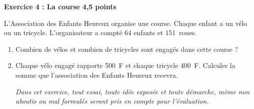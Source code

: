 \textbf{Exercice 4 : La course \hfill 4,5 points}

\medskip

L'Association des Enfants Heureux organise une course. Chaque
enfant a un vélo ou un tricycle. L'organisateur a compté $64$ enfants et
$151$~roues.

\medskip

\begin{enumerate}
\item Combien de vélos et combien de tricycles sont engagés dans
cette course ?
\item Chaque vélo engagé rapporte 500~F et chaque tricycle 400~F. Calculer la
somme que l'association des Enfants Heureux recevra.

\emph{Dans cet exercice, tout essai, toute idée exposée et toute démarche, même non aboutis ou mal formulés seront pris en compte pour l'évaluation.}
\end{enumerate}

\vspace{0,5cm}

